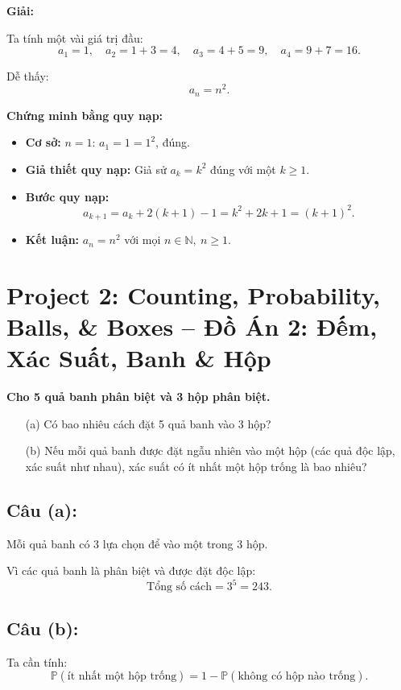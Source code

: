 \documentclass{article}
\begin{document}
	\textbf{Giải:}
	
	Ta tính một vài giá trị đầu:
	\[
	a_1 = 1,\quad a_2 = 1 + 3 = 4,\quad a_3 = 4 + 5 = 9,\quad a_4 = 9 + 7 = 16.
	\]
	
	Dễ thấy:
	\[
	a_n = n^2.
	\]
	
	\textbf{Chứng minh bằng quy nạp:}
	
	\begin{itemize}[leftmargin=1.5cm]
		\item \textbf{Cơ sở:} $n = 1$: $a_1 = 1 = 1^2$, đúng.
		
		\item \textbf{Giả thiết quy nạp:} Giả sử $a_k = k^2$ đúng với một $k \ge 1$.
		
		\item \textbf{Bước quy nạp:}
		\[
		a_{k+1} = a_k + 2(k+1) - 1 = k^2 + 2k + 1 = (k+1)^2.
		\]
		
		\item \textbf{Kết luận:} $a_n = n^2$ với mọi $n \in \mathbb{N},\ n \ge 1$.
	\end{itemize}
	
	\section{Project 2: Counting, Probability, Balls, \& Boxes -- Đồ Án 2: Đếm, Xác Suất, Banh \& Hộp}
	
	\textbf{Cho 5 quả banh phân biệt và 3 hộp phân biệt.}
	
	\begin{itemize}[leftmargin=1.5cm]
		\item[(a)] Có bao nhiêu cách đặt 5 quả banh vào 3 hộp?
		\item[(b)] Nếu mỗi quả banh được đặt ngẫu nhiên vào một hộp (các quả độc lập, xác suất như nhau), xác suất có ít nhất một hộp trống là bao nhiêu?
	\end{itemize}
	
	\subsection*{Câu (a):}
	Mỗi quả banh có 3 lựa chọn để vào một trong 3 hộp.
	
	Vì các quả banh là phân biệt và được đặt độc lập:
	\[
	\text{Tổng số cách} = 3^5 = 243.
	\]
	
	\subsection*{Câu (b):}
	Ta cần tính:
	\[
	\mathbb{P}(\text{ít nhất một hộp trống}) = 1 - \mathbb{P}(\text{không có hộp nào trống}).
	\]
	
\end{document}
